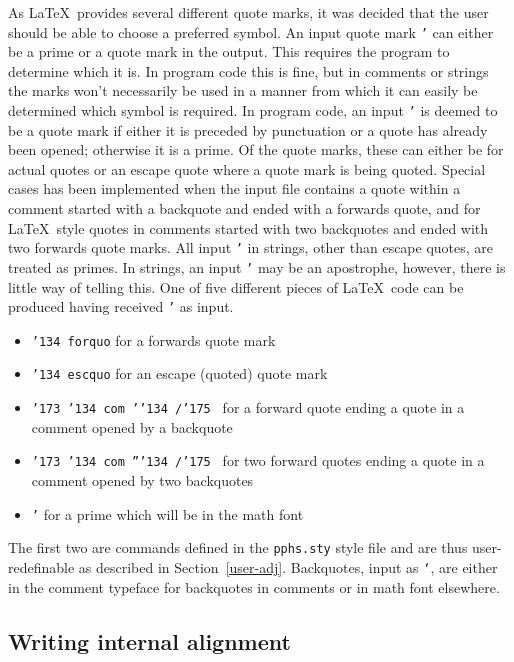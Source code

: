 As \LaTeX\ provides several different quote marks, it was decided that the user
should be able to choose a preferred symbol.  An input quote mark {\tt '} can
either be a prime or a quote mark in the output.  This requires the program to
determine which it is.  In program code this is fine, but in comments or strings
the marks won't necessarily be used in a manner from which it can easily be
determined which symbol is required.  In program code, an input {\tt '} is deemed
to be a quote mark if either it is preceded by punctuation or a quote has
already been opened; otherwise it is a prime.  Of the quote marks, these can
either be for actual quotes or an escape quote where a quote mark is being quoted.
Special cases has been implemented when the input file contains a quote within a comment
started with a backquote and ended with a forwards quote, and for \LaTeX\ style
quotes in comments started with two backquotes and ended with two forwards quote
marks.  All input {\tt '} in strings, other than escape quotes, are treated
as primes.  In strings, an input {\tt '} may be an apostrophe, however, there is
little way of telling this.\label{string-apostrophe}  One of five different pieces
of \LaTeX\ code can be produced having received {\tt '} as input.
\begin{itemize}
\item {\tt \char'134 forquo} for a forwards quote mark
\item {\tt \char'134 escquo} for an escape (quoted) quote mark
\item {\tt \char'173 \char'134 com '\char'134 /\char'175 } for a forward quote ending a quote
in a comment opened by a backquote
\item {\tt \char'173 \char'134 com ''\char'134 /\char'175 } for two forward quotes ending a quote
in a comment opened by two backquotes
\item {\tt '} for a prime which will be in the math font
\end{itemize}
The first two are commands defined in the {\tt pphs.sty} style file and are
thus user-redefinable as described in Section~\ref{user-adj}.  Backquotes, input
as {\tt `}, are either in the comment typeface for backquotes in comments or in
math font elsewhere.

\subsection{Writing internal alignment}

